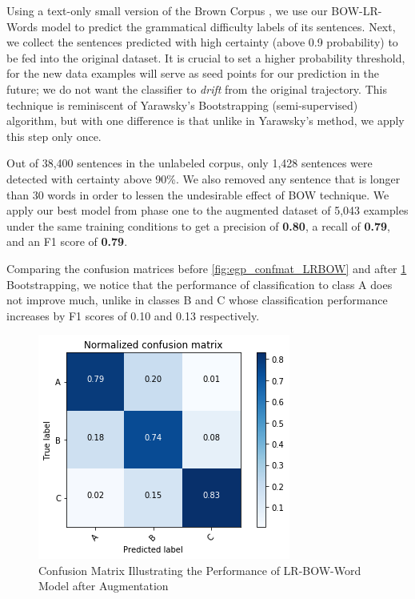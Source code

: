 Using a text-only small version of the Brown Corpus \citep{francis1965standard}, we use our BOW-LR-Words model to predict the grammatical difficulty labels of its sentences. Next, we collect the sentences predicted with high certainty (above 0.9 probability) to be fed into the original dataset. It is crucial to set a higher probability threshold, for the new data examples will serve as seed points for our prediction in the future; we do not want the classifier to \textit{drift} from the original trajectory. \citep{curran2007minimising} This technique is reminiscent of Yarawsky's Bootstrapping \citep{yarowsky_unsupervised_1995}(semi-supervised) algorithm, but with one difference is that unlike in Yarawsky's method, we apply this step only once. 

Out of 38,400 sentences in the unlabeled corpus, only 1,428 sentences were detected with certainty above 90\%. We also removed any sentence that is longer than 30 words in order to lessen the undesirable effect of BOW technique. We apply our best model from phase one to the augmented dataset of 5,043 examples under the same training conditions to get a precision of \textbf{0.80}, a recall of \textbf{0.79}, and an F1 score of \textbf{0.79}. 

Comparing the confusion matrices before \ref{fig:egp_confmat_LRBOW} and after \ref{fig:egp_confmat_LRBOW_aug} Bootstrapping, we notice that the performance of classification to class A does not improve much, unlike in classes B and C whose classification performance increases by F1 scores of 0.10 and 0.13 respectively. 

\begin{figure}[t]
    \centering
    \includegraphics[width=.75\linewidth]{../Figures/conf_matrix_iter2.png} 
    \caption{Confusion Matrix Illustrating the Performance of LR-BOW-Word Model after Augmentation}
    \label{fig:egp_confmat_LRBOW_aug}
\end{figure}

